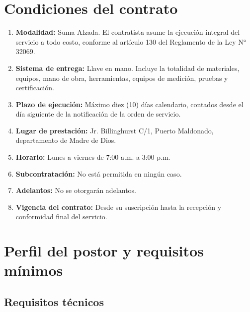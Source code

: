 \documentclass[12pt,a4paper]{article}
\begin{document}
\section{Condiciones del contrato}

\begin{enumerate}[label=\textbf{\arabic{enumi}.}]

  \item \textbf{Modalidad:} Suma Alzada. El contratista asume la ejecución integral del servicio a todo costo, conforme al artículo 130 del Reglamento de la Ley N° 32069.

  \item \textbf{Sistema de entrega:} Llave en mano. Incluye la totalidad de materiales, equipos, mano de obra, herramientas, equipos de medición, pruebas y certificación.

  \item \textbf{Plazo de ejecución:} Máximo diez (10) días calendario, contados desde el día siguiente de la notificación de la orden de servicio.

  \item \textbf{Lugar de prestación:} Jr. Billinghurst C/1, Puerto Maldonado, departamento de Madre de Dios.

  \item \textbf{Horario:} Lunes a viernes de 7:00 a.m. a 3:00 p.m.

  \item \textbf{Subcontratación:} No está permitida en ningún caso.

  \item \textbf{Adelantos:} No se otorgarán adelantos.

  \item \textbf{Vigencia del contrato:} Desde su suscripción hasta la recepción y conformidad final del servicio.

\end{enumerate}

\section{Perfil del postor y requisitos mínimos}

\subsection{Requisitos técnicos}
\end{document}
